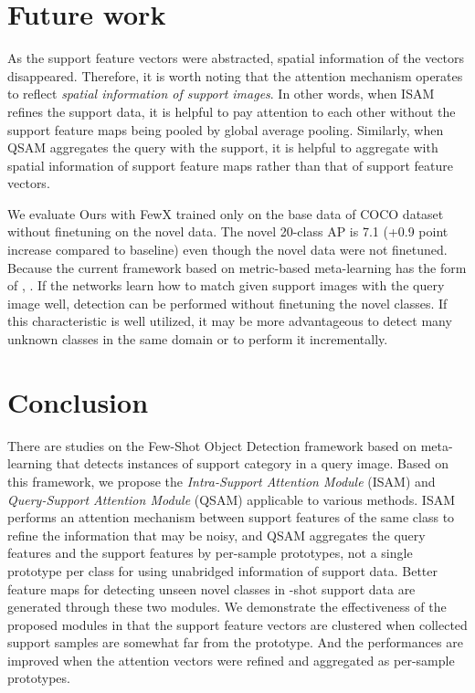 \documentclass[10pt,twocolumn,letterpaper]{article}
\begin{document}
\section{Future work}
\label{sec:future work}
\quad As the support feature vectors were abstracted, spatial information of the vectors disappeared. Therefore, it is worth noting that the attention mechanism operates to reflect \textit{spatial information of support images}. In other words, when ISAM refines the support data, it is helpful to pay attention to each other without the support feature maps being pooled by global average pooling.
Similarly, when QSAM aggregates the query with the support, it is helpful to aggregate with spatial information of support feature maps rather than that of support feature vectors.

\vspace{+0.15cm}
\quad We evaluate Ours with FewX trained only on the base data of COCO dataset without finetuning on the novel data. The novel 20-class AP is 7.1 (+0.9 point increase compared to baseline) even though the novel data were not finetuned. Because the current framework based on metric-based meta-learning has the form of  ,   . If the networks learn how to match given support images with the query image well, detection can be performed without finetuning the novel classes. If this characteristic is well utilized, it may be more advantageous to detect many unknown classes in the same domain or to perform it incrementally.




\section{Conclusion}
\label{sec:conclusion}
There are studies on the Few-Shot Object Detection framework based on meta-learning that detects instances of support category in a query image. Based on this framework, we propose the \textit{Intra-Support Attention Module} (ISAM) and \textit{Query-Support Attention Module} (QSAM) applicable to various methods. ISAM performs an attention mechanism between support features of the same class to refine the information that may be noisy, and QSAM aggregates the query features and the support features by per-sample prototypes, not a single prototype per class for using unabridged information of support data. Better feature maps for detecting unseen novel classes in -shot support data are generated through these two modules. We demonstrate the effectiveness of the proposed modules in that the support feature vectors are clustered when collected support samples are somewhat far from the prototype. And the performances are improved when the attention vectors were refined and aggregated as per-sample prototypes.





\clearpage

{\small


}
\end{document}
